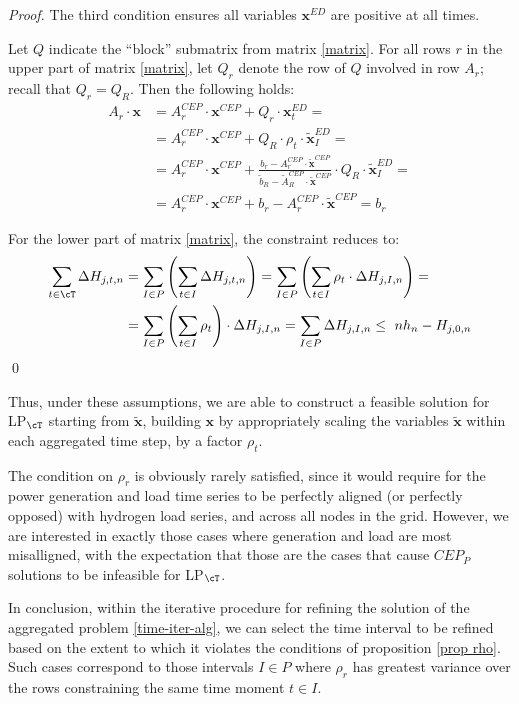 \documentclass[smallextended,natbib]{svjour3}       %
\numberwithin{theorem}{section}
\begin{document}
\begin{proof}
  The third condition ensures all variables $\mathbf{x}^{ED}$ are positive at all times.

  Let $Q$ indicate the ``block'' submatrix from matrix \ref{matrix}. 
  For all rows $r$ in the upper part of matrix \ref{matrix}, let $Q_r$ denote the row of $Q$ involved in row $A_r$; recall that $Q_r=Q_R$. Then the following holds:
\begin{align*}
A_r \cdot \mathbf{x} &=A^{CEP}_r\cdot \mathbf{x}^{CEP} +  Q_r\cdot \mathbf{x}^{ED}_t = \\
&=A^{CEP}_r\cdot \mathbf{x}^{CEP} +  Q_R\cdot \rho_t\cdot\tilde{\mathbf{x}}^{ED}_I = \\
&=A^{CEP}_r\cdot \mathbf{x}^{CEP} + \frac{b_r - A_r^{CEP} \cdot \tilde{\mathbf{x}}^{CEP}}{\tilde{b}_R - \tilde{A}_R^{CEP}\cdot \tilde{\mathbf{x}}^{CEP}} \cdot Q_R \cdot \tilde{\mathbf{x}}^{ED}_I =\\
&=A^{CEP}_r\cdot \mathbf{x}^{CEP} + b_r - A^{CEP}_r\cdot \tilde{\mathbf{x}}^{CEP} = b_r
\end{align*}

For the lower part of matrix \ref{matrix}, the constraint reduces to:
\begin{align*}
\sum_{t\in \cT} \Delta H_{j,t,n} &= \sum_{I\in P} \left( \sum_{t\in I} \Delta H_{j,t,n} \right) = \sum_{I\in P} \left( \sum_{t\in I} \rho_t\cdot\Delta H_{j,I,n} \right) = \\
& = \sum_{I\in P} \left( \sum_{t\in I} \rho_t \right)\cdot\Delta H_{j,I,n} =  \sum_{I\in P}\Delta H_{j,I,n} \le \ nh_n - H_{j,0,n}
\end{align*}
\qed\end{proof}

Thus, under these assumptions, we are able to construct a feasible solution for LP$_{\cT}$ starting from $\tilde{\mathbf{x}}$, building $\mathbf{x}$ by appropriately scaling the variables  $\tilde{\mathbf{x}}$ within each aggregated time step, by a factor $\rho_t$.


The condition on $\rho_r$ is obviously rarely satisfied, since it would require for the power generation and load time series to be perfectly aligned (or perfectly opposed) with hydrogen load series, and across all nodes in the grid.
However, we are interested in exactly those cases where generation and load are most misalligned, with the expectation that those are the cases that cause $CEP_P$ solutions to be infeasible for LP$_{\cT}$.

In conclusion, within the iterative procedure for refining the solution of the aggregated problem \ref{time-iter-alg}, we can select the time interval to be refined based on the extent to which it violates the conditions of proposition \ref{prop rho}.
Such cases correspond to those intervals $I\in P$ where $\rho_r$ has greatest variance over the rows constraining the same time moment $t\in I$. 
\end{document}
